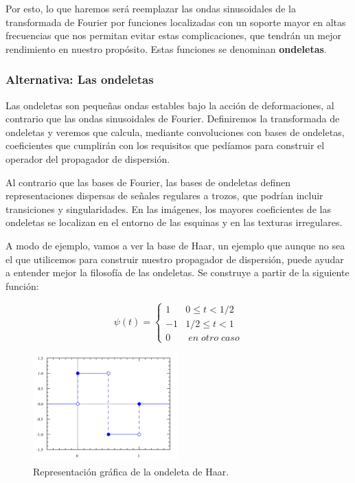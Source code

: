 \medskip

\noindent Por esto, lo que haremos será reemplazar las ondas sinusoidales de la transformada de Fourier por funciones localizadas con un soporte mayor en altas frecuencias que nos permitan evitar estas complicaciones, que tendrán un mejor rendimiento en nuestro propósito. Estas funciones se denominan \textbf{ondeletas}. 

\medskip

\subsubsection{Alternativa: Las ondeletas}

\noindent Las ondeletas \cite{MallatWavelets} son pequeñas ondas estables bajo la acción de deformaciones, al contrario que las ondas sinusoidales de Fourier. Definiremos la transformada de ondeletas y veremos que calcula, mediante convoluciones con bases de ondeletas, coeficientes que cumplirán con los requisitos que pedíamos para construir el operador del propagador de dispersión.

\medskip

\noindent Al contrario que las bases de Fourier, las bases de ondeletas definen  representaciones dispersas de señales regulares a trozos, que podrían incluir transiciones y singularidades. En las imágenes, los mayores coeficientes de las ondeletas se localizan en el entorno de las esquinas y en las texturas irregulares.

\medskip

\noindent A modo de ejemplo, vamos a ver la base de Haar, un ejemplo que aunque no sea el que utilicemos para construir nuestro propagador de dispersión, puede ayudar a entender mejor la filosofía de las ondeletas. Se construye a partir de la siguiente función: 

$$ \psi(t)= \begin{cases} 
      1 & 0\leq t < 1/2 \\
      -1 & 1/2\leq t < 1 \\
      0 & \; en \; otro \; caso
   \end{cases}$$

\begin{figure}[!h]
  \centering
  \includegraphics[width=0.5\textwidth]{img/Haar_wavelet.png}
  \caption{Representación gráfica de la ondeleta de Haar.}
  \label{fig:Ondeleta_de_Haar}
\end{figure}

